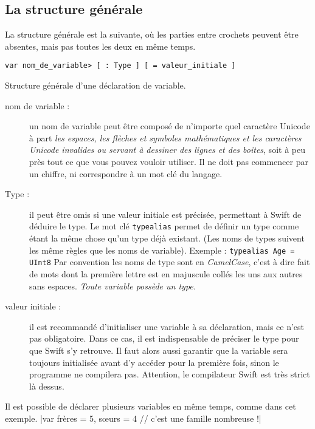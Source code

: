 \subsection{La structure générale}
La structure générale est la suivante,
où les parties entre crochets peuvent être absentes,
mais pas toutes les deux en même temps.

\begin{listing}[h]
\begin{verbatim}
var nom_de_variable> [ : Type ] [ = valeur_initiale ]
\end{verbatim}
\caption{Structure générale d'une déclaration de variable.}
\end{listing}

\begin{description}

\item[nom de variable :]
un nom de variable peut être composé de n'importe quel caractère Unicode
à part \emph{les espaces, les flèches et symboles mathématiques et les
caractères Unicode invalides ou servant à dessiner des lignes et des boites},
soit à peu près tout ce que vous pouvez vouloir utiliser.
Il ne doit pas commencer par un chiffre, ni correspondre à un mot clé du langage.


\item[Type :] il peut être omis si une valeur initiale est précisée,
permettant à Swift de déduire le type.
Le mot clé \texttt{typealias} permet de définir un type
comme étant la même chose qu'un type déjà existant.
(Les noms de types suivent les même règles que les noms de variable).
Exemple :
\texttt{typealias Age = UInt8}
Par convention les noms de type sont en \emph{CamelCase},
c'est à dire fait de mots dont la première lettre est en majuscule
collés les uns aux autres sans espaces.
\emph{Toute variable possède un type.}

\item[valeur initiale :]
il est recommandé d'initialiser une variable à sa déclaration,
mais ce n'est pas obligatoire.
Dans ce cas, il est indispensable de préciser le type pour que Swift s'y retrouve. 
Il faut alors aussi garantir que la variable sera toujours initialisée
avant d'y accéder pour la première fois, sinon le programme ne compilera pas.
Attention, le compilateur Swift est très strict là dessus.
\end{description}

Il est possible de déclarer plusieurs variables en même temps, comme dans cet exemple.
|var frères = 5, sœurs = 4 // c'est une famille nombreuse !|
